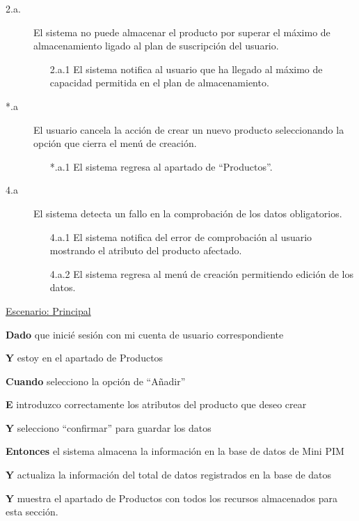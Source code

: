 \begin{description}
    \item[2.a.] El sistema no puede almacenar el producto por superar el máximo de almacenamiento ligado al plan de suscripción del usuario.
    \begin{enumerate}
        \item[2.a.1] El sistema notifica al usuario que ha llegado al máximo de capacidad permitida en el plan de almacenamiento.
    \end{enumerate}

    \item[*.a] El usuario cancela la acción de crear un nuevo producto seleccionando la opción que cierra el menú de creación.
    \begin{enumerate}
        \item[*.a.1] El sistema regresa al apartado de \enquote{Productos}.
    \end{enumerate}

    \item[4.a] El sistema detecta un fallo en la comprobación de los datos obligatorios.
    \begin{enumerate}
        \item[4.a.1] El sistema notifica del error de comprobación al usuario mostrando el atributo del producto afectado.
        \item[4.a.2] El sistema regresa al menú de creación permitiendo edición de los datos.
    \end{enumerate}
\end{description}

\underline{Escenario: Principal}\par
\vspace{0.15cm}
\textbf{Dado} que inicié sesión con mi cuenta de usuario correspondiente\par
\textbf{Y} estoy en el apartado de Productos\par
\textbf{Cuando} selecciono la opción de \enquote{Añadir}\par
\textbf{E} introduzco correctamente los atributos del producto que deseo crear\par
\textbf{Y} selecciono \enquote{confirmar} para guardar los datos\par
\textbf{Entonces} el sistema almacena la información en la base de datos de Mini PIM\par
\textbf{Y} actualiza la información del total de datos registrados en la base de datos\par
\textbf{Y} muestra el apartado de Productos con todos los recursos almacenados para esta sección.\par
\vspace{0.20cm}

